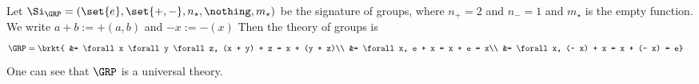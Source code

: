 \begin{ex}

\end{ex}

\begin{dfn}
    Let $\Si_\GRP = (\set{e},\set{+,-}, n_\star, \nothing, m_\star)$
    be the signature of groups, where
    $n_+ = 2$ and $n_- = 1$ and $m_\star$ is the empty function.
    We write $a + b := + (a,b)$ and $- x := -(x)$
    Then the theory of groups is
    \begin{align*}
        \GRP &= \brkt{
        &= \forall x \forall y \forall z, (x + y) + z = x + (y + z)\\
        &= \forall x, e + x = x + e = x\\
        &= \forall x, (- x) + x = x + (- x) = e}
    \end{align*}
    One can see that $\GRP$ is a universal theory.
\end{dfn}

